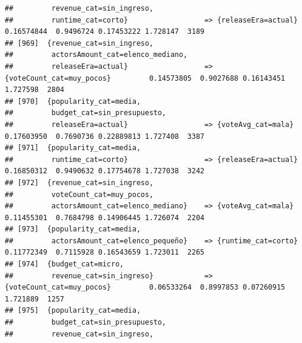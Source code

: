 \documentclass[
]{article}
\begin{document}
\begin{verbatim}
##         revenue_cat=sin_ingreso,                                                                                                
##         runtime_cat=corto}                  => {releaseEra=actual}               0.16574844  0.9496724 0.17453222 1.728147  3189
## [969]  {revenue_cat=sin_ingreso,                                                                                                
##         actorsAmount_cat=elenco_mediano,                                                                                        
##         releaseEra=actual}                  => {voteCount_cat=muy_pocos}         0.14573805  0.9027688 0.16143451 1.727598  2804
## [970]  {popularity_cat=media,                                                                                                   
##         budget_cat=sin_presupuesto,                                                                                             
##         releaseEra=actual}                  => {voteAvg_cat=mala}                0.17603950  0.7690736 0.22889813 1.727408  3387
## [971]  {popularity_cat=media,                                                                                                   
##         runtime_cat=corto}                  => {releaseEra=actual}               0.16850312  0.9490632 0.17754678 1.727038  3242
## [972]  {revenue_cat=sin_ingreso,                                                                                                
##         voteCount_cat=muy_pocos,                                                                                                
##         actorsAmount_cat=elenco_mediano}    => {voteAvg_cat=mala}                0.11455301  0.7684798 0.14906445 1.726074  2204
## [973]  {popularity_cat=media,                                                                                                   
##         actorsAmount_cat=elenco_pequeño}    => {runtime_cat=corto}               0.11772349  0.7115928 0.16543659 1.723011  2265
## [974]  {budget_cat=micro,                                                                                                       
##         revenue_cat=sin_ingreso}            => {voteCount_cat=muy_pocos}         0.06533264  0.8997853 0.07260915 1.721889  1257
## [975]  {popularity_cat=media,                                                                                                   
##         budget_cat=sin_presupuesto,                                                                                             
##         revenue_cat=sin_ingreso,                                                                                                

\end{verbatim}
\end{document}
